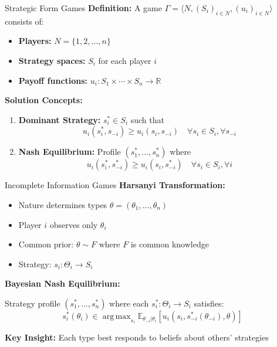 \documentclass[xcolor={x11names}, aspectratio=169 ]{beamer}
\DeclareMathOperator*{\argmax}{arg\,max}
\begin{document}
\begin{frame}{Strategic Form Games}
\textbf{Definition:} A game $\Gamma = \langle N, (S_i)_{i \in N}, (u_i)_{i \in N} \rangle$ consists of:
\begin{itemize}
  \item \textbf{Players:} $N = \{1, 2, \ldots, n\}$
  \item \textbf{Strategy spaces:} $S_i$ for each player $i$
  \item \textbf{Payoff functions:} $u_i: S_1 \times \cdots \times S_n \to \mathbb{R}$
\end{itemize}

\vspace{0.3cm}
\textbf{Solution Concepts:}
\begin{enumerate}
  \item \textbf{Dominant Strategy:} $s_i^* \in S_i$ such that
  \[u_i(s_i^*, s_{-i}) \geq u_i(s_i, s_{-i}) \quad \forall s_i \in S_i, \forall s_{-i}\]
  
  \item \textbf{Nash Equilibrium:} Profile $(s_1^*, \ldots, s_n^*)$ where
  \[u_i(s_i^*, s_{-i}^*) \geq u_i(s_i, s_{-i}^*) \quad \forall s_i \in S_i, \forall i\]
\end{enumerate}
\end{frame}

\begin{frame}{Incomplete Information Games}
\textbf{Harsanyi Transformation:}
\begin{itemize}
  \item Nature determines types $\theta = (\theta_1, \ldots, \theta_n)$
  \item Player $i$ observes only $\theta_i$
  \item Common prior: $\theta \sim F$ where $F$ is common knowledge
  \item Strategy: $s_i: \Theta_i \to S_i$
\end{itemize}

\vspace{0.3cm}
\textbf{Bayesian Nash Equilibrium:}

Strategy profile $(s_1^*, \ldots, s_n^*)$ where each $s_i^*: \Theta_i \to S_i$ satisfies:
\[s_i^*(\theta_i) \in \argmax_{s_i} \mathbb{E}_{\theta_{-i}|\theta_i}[u_i(s_i, s_{-i}^*(\theta_{-i}), \theta)]\]

\vspace{0.3cm}
\textbf{Key Insight:} Each type best responds to beliefs about others' strategies
\end{frame}
\end{document}
